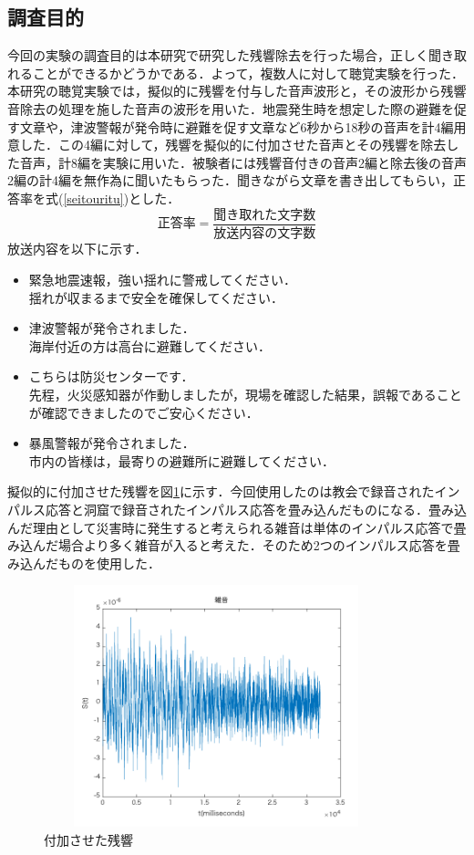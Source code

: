 \documentclass[a4j,11pt]{jsarticle}
\begin{document}
\subsection{調査目的}
今回の実験の調査目的は本研究で研究した残響除去を行った場合，正しく聞き取れることができるかどうかである．よって，複数人に対して聴覚実験を行った．本研究の聴覚実験では，擬似的に残響を付与した音声波形と，その波形から残響音除去の処理を施した音声の波形を用いた．地震発生時を想定した際の避難を促す文章や，津波警報が発令時に避難を促す文章など6秒から18秒の音声を計4編用意した．この4編に対して，残響を擬似的に付加させた音声とその残響を除去した音声，計8編を実験に用いた．被験者には残響音付きの音声2編と除去後の音声2編の計4編を無作為に聞いたもらった．聞きながら文章を書き出してもらい，正答率を式(\ref{seitouritu})とした．
\begin{equation}
	\label{seitouritu}
  正答率 = \frac{聞き取れた文字数}{放送内容の文字数}
\end{equation}
放送内容を以下に示す．
\begin{itemize}
\item 緊急地震速報，強い揺れに警戒してください．\\
揺れが収まるまで安全を確保してください．
\item 津波警報が発令されました．\\
海岸付近の方は高台に避難してください．
\item こちらは防災センターです．\\
先程，火災感知器が作動しましたが，現場を確認した結果，誤報であることが確認できましたのでご安心ください．
\item 暴風警報が発令されました．\\
市内の皆様は，最寄りの避難所に避難してください．
\end{itemize}

\newpage
擬似的に付加させた残響を図\ref{fig:zatuon}に示す．今回使用したのは教会で録音されたインパルス応答と洞窟で録音されたインパルス応答を畳み込んだものになる．畳み込んだ理由として災害時に発生すると考えられる雑音は単体のインパルス応答で畳み込んだ場合より多く雑音が入ると考えた．そのため2つのインパルス応答を畳み込んだものを使用した．

\begin{figure}[h]
\begin{center}
 \includegraphics[clip,width=100mm,height=70mm]{zatsuon.pdf}
\end{center}
 \caption{付加させた残響}
 \label{fig:zatuon}
\end{figure}
\end{document}
